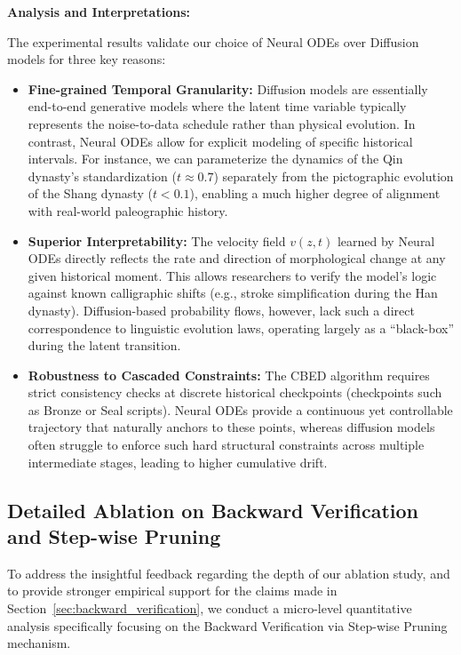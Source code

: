 \documentclass{article}
\begin{document}
\noindent \textbf{Analysis and Interpretations:}

The experimental results validate our choice of Neural ODEs over Diffusion models for three key reasons:

\begin{itemize}
    \item \textbf{Fine-grained Temporal Granularity:} Diffusion models are essentially end-to-end generative models where the latent time variable typically represents the noise-to-data schedule rather than physical evolution. In contrast, Neural ODEs allow for explicit modeling of specific historical intervals. For instance, we can parameterize the dynamics of the Qin dynasty's standardization ($t \approx 0.7$) separately from the pictographic evolution of the Shang dynasty ($t < 0.1$), enabling a much higher degree of alignment with real-world paleographic history.
    
    \item \textbf{Superior Interpretability:} The velocity field $v(z, t)$ learned by Neural ODEs directly reflects the rate and direction of morphological change at any given historical moment. This allows researchers to verify the model's logic against known calligraphic shifts (e.g., stroke simplification during the Han dynasty). Diffusion-based probability flows, however, lack such a direct correspondence to linguistic evolution laws, operating largely as a ``black-box'' during the latent transition.
    
    \item \textbf{Robustness to Cascaded Constraints:} The CBED algorithm requires strict consistency checks at discrete historical checkpoints (checkpoints such as Bronze or Seal scripts). Neural ODEs provide a continuous yet controllable trajectory that naturally anchors to these points, whereas diffusion models often struggle to enforce such hard structural constraints across multiple intermediate stages, leading to higher cumulative drift.
\end{itemize}


\subsection{Detailed Ablation on Backward Verification and Step-wise Pruning}
\label{sec:ablation_backward_verification}

To address the insightful feedback regarding the depth of our ablation study, and to provide stronger empirical support for the claims made in Section~\ref{sec:backward_verification}, we conduct a micro-level quantitative analysis specifically focusing on the Backward Verification via Step-wise Pruning mechanism. 
\end{document}
